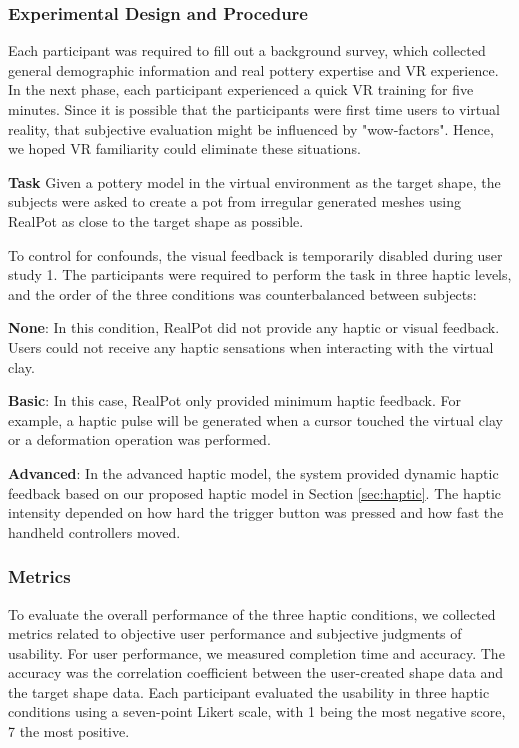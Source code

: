 \documentclass{svjour3}                     %
\begin{document}
{\subsubsection{Experimental Design and Procedure}

Each participant was required to fill out a background survey, which collected general demographic information and real pottery expertise and VR experience.
In the next phase, each participant experienced a quick VR training for five minutes.
Since it is possible that the participants were first time users to virtual reality, that subjective evaluation might be influenced by "wow-factors".
Hence, we hoped VR familiarity could eliminate these situations.

\textbf{Task} Given a pottery model in the virtual environment as the target shape, the subjects were asked to create a pot from irregular generated meshes using RealPot as close to the target shape as possible.

To control for confounds, the visual feedback is temporarily disabled during user study 1.
The participants were required to perform the task in three haptic levels, and the order of the three conditions was counterbalanced between subjects:

\textbf{None}: In this condition, RealPot did not provide any haptic or visual feedback. Users could not receive any haptic sensations when interacting with the virtual clay.

\textbf{Basic}: In this case, RealPot only provided minimum haptic feedback. For example, a haptic pulse will be generated when a cursor touched the virtual clay or a deformation operation was performed.

\textbf{Advanced}: In the advanced haptic model, the system provided dynamic haptic feedback based on our proposed haptic model in Section \ref{sec:haptic}. The haptic intensity depended on how hard the trigger button was pressed and how fast the handheld controllers moved.


\subsubsection{Metrics}

To evaluate the overall performance of the three haptic conditions, we collected metrics related to objective user performance and subjective judgments of usability.
%
For user performance, we measured completion time and accuracy. The accuracy was the correlation coefficient between the user-created shape data and the target shape data.
%
Each participant evaluated the usability in three haptic conditions using a seven-point Likert scale, with 1 being the most negative score, 7 the most positive.

}
\end{document}
